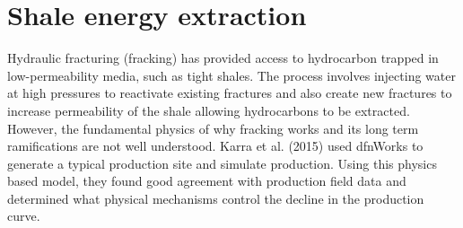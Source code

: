 \documentclass[letterpaper,10pt,english]{sphinxmanual}
\begin{document}
\section{Shale energy extraction}
\label{\detokenize{applications:shale-energy-extraction}}
Hydraulic fracturing (fracking) has provided access to hydrocarbon trapped in low-permeability media, such as tight shales. The process involves injecting water at high pressures to reactivate existing fractures and also create new fractures to increase permeability of the shale allowing hydrocarbons to be extracted. However, the fundamental physics of why fracking works and its long term ramifications are not well understood. Karra et al. (2015) used dfnWorks to generate a typical production site and simulate production. Using this physics based model, they found good agreement with production field data and determined what physical mechanisms control the decline in the production curve.
\begin{figure}[htbp]
\centering
\capstart

\noindent{}
\caption{}\label{\detokenize{applications:id2}}\end{figure}
\end{document}

